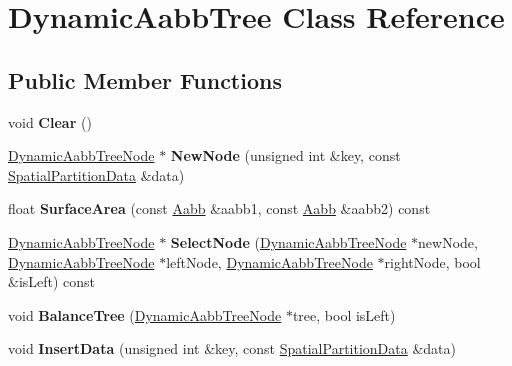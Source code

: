 \hypertarget{classDynamicAabbTree}{}\section{Dynamic\+Aabb\+Tree Class Reference}
\label{classDynamicAabbTree}
\subsection*{Public Member Functions}
\begin{DoxyCompactItemize}
\item 
\mbox{\label{classDynamicAabbTree_af94357cbb891f9e969f742b24e3ffb70}} 
void {\bfseries Clear} ()
\item 
\mbox{\label{classDynamicAabbTree_a32d608fc624edf024e369a7ac334d1e7}} 
\hyperlink{classDynamicAabbTreeNode}{Dynamic\+Aabb\+Tree\+Node} $\ast$ {\bfseries New\+Node} (unsigned int \&key, const \hyperlink{classSpatialPartitionData}{Spatial\+Partition\+Data} \&data)
\item 
\mbox{\label{classDynamicAabbTree_a6ba7bea87bd61579da6ee83f744cee00}} 
float {\bfseries Surface\+Area} (const \hyperlink{classAabb}{Aabb} \&aabb1, const \hyperlink{classAabb}{Aabb} \&aabb2) const
\item 
\mbox{\label{classDynamicAabbTree_acc10af3765dfe7db89416e87f9c0c304}} 
\hyperlink{classDynamicAabbTreeNode}{Dynamic\+Aabb\+Tree\+Node} $\ast$ {\bfseries Select\+Node} (\hyperlink{classDynamicAabbTreeNode}{Dynamic\+Aabb\+Tree\+Node} $\ast$new\+Node, \hyperlink{classDynamicAabbTreeNode}{Dynamic\+Aabb\+Tree\+Node} $\ast$left\+Node, \hyperlink{classDynamicAabbTreeNode}{Dynamic\+Aabb\+Tree\+Node} $\ast$right\+Node, bool \&is\+Left) const
\item 
\mbox{\label{classDynamicAabbTree_a5b1ccfaeccdac45d57316b61eb9a49ac}} 
void {\bfseries Balance\+Tree} (\hyperlink{classDynamicAabbTreeNode}{Dynamic\+Aabb\+Tree\+Node} $\ast$tree, bool is\+Left)
\item 
\mbox{\label{classDynamicAabbTree_a1ede16b26b57e97564fb605f65acb4b6}} 
void {\bfseries Insert\+Data} (unsigned int \&key, const \hyperlink{classSpatialPartitionData}{Spatial\+Partition\+Data} \&data)

\end{DoxyCompactItemize}

